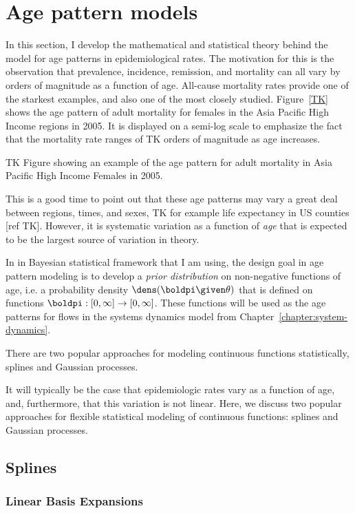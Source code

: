 \section{Age pattern models}
\label{theory-age_pattern_model}
In this section, I develop the mathematical and statistical theory behind the 
model for age patterns in epidemiological rates.  The motivation for
this is the observation that prevalence, incidence, remission, and
mortality can all vary by orders of magnitude as a function of age.
All-cause mortality rates provide one of the starkest examples, and
also one of the most closely studied.  Figure~\ref{TK} shows the age
pattern of adult mortality for females in the Asia Pacific High Income
regions in 2005.  It is displayed on a semi-log scale to emphasize the
fact that the mortality rate ranges of TK orders of magnitude as age
increases.

TK Figure showing an example of the age pattern
for adult mortality in Asia Pacific High Income Females in 2005.

This
is a good time to point out that these age patterns may vary a great
deal between regions, times, and sexes, TK for example life expectancy
in US counties [ref TK].  However, it is systematic variation as a
function of \emph{age} that is expected to be the largest source of
variation in theory.

In in Bayesian statistical framework that I am using, the design goal
in age pattern modeling is to develop a \emph{prior distribution} on
non-negative functions of age, i.e. a probability density
$\dens(\boldpi\given\theta)$ that is defined on functions
$\boldpi:[0,\infty]\rightarrow[0,\infty]$.  These functions will be used as
the age patterns for flows in the systems dynamics model from
Chapter~\ref{chapter:system-dynamics}.

There are two popular approaches for modeling continuous functions
statistically, splines and Gaussian processes.


It will typically be the case that epidemiologic rates vary as a
function of age, and, furthermore, that this variation is not
linear. Here, we discuss two popular approaches for flexible
statistical modeling of continuous functions: splines and Gaussian
processes.

\subsection{Splines}

\subsubsection{Linear Basis Expansions}

